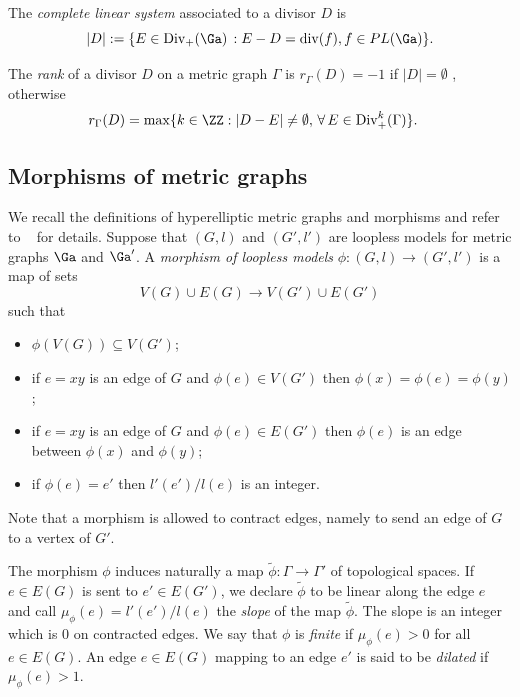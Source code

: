 The \emph{complete linear system} associated to a divisor $D$ is
\[
|D|:=\{E\in\mathrm{Div}_+(\Ga) \,:E-D=\mathrm{div}(f), f\in PL(\Ga)\}.
\]


     
	  The \emph{rank} of a divisor $D$ on a metric graph $\Gamma$ 
	  is $r_{\Gamma}(D)=-1$ 
	   if $|D|=\emptyset$
	   , 
	   otherwise
	  \begin{equation*}
	  \begin{aligned}
	  &r_{\Gamma}(D)=\max\{k\in \ZZ: |D-E|\ne\emptyset,\,\forall\,E\in\mathrm{Div}^k_+(\Gamma) \}. 
	  \end{aligned}
	  \end{equation*}


\subsection{Morphisms of metric graphs}
We recall the definitions of hyperelliptic metric graphs and morphisms and refer to ~\cite{CH, LenUlirschZakharov_abelianCovers} for details. 
Suppose that $(G,l)$ and $(G',l')$ are loopless models for metric graphs $\Ga$ and $\Ga'$. A \emph{morphism of loopless models} $\phi\colon(G,l)\to (G',l')$ is a map of sets 
\[
V(G)\cup E(G)\to V(G')\cup E(G')
\]
such that
\begin{itemize}
    \item[i)] $\phi(V(G))\subseteq V(G')$;
    \item[ii)] if $e=xy$ is an edge of $G$ and $\phi(e)\in V(G')$ then $\phi(x)=\phi(e)=\phi(y)$;
    \item[iii)] if $e=xy$ is an edge of $G$ and $\phi(e)\in E(G')$  then $\phi(e)$ is an edge between $\phi(x)$ and $\phi(y)$;
    \item[iv)] if $\phi(e)=e'$ then $l'(e')/l(e)$ is an integer.
\end{itemize}
Note that a morphism is allowed to contract edges, namely to send an edge of $G$ to a vertex of $G'$.

The morphism $\phi$ induces naturally a map $\tilde{\phi}\colon \Gamma\to \Gamma'$ of topological spaces. 
If $e\in E(G)$ is sent to $e'\in E(G')$, we declare $\tilde{\phi}$ to be linear along the edge $e$ and call $\mu_{\phi}(e)=l'(e')/l(e)$ the \emph{slope} of the map $\tilde\phi$.
The slope is an integer which is 0 on contracted edges.  We say that $\phi$ is \emph{finite} if $\mu_{\phi}(e)>0$ for all $e\in E(G)$. 
An edge $e\in E(G)$ mapping to an edge $e'$ is said to be \emph{dilated} if $\mu_{\phi}(e) >  1$.


